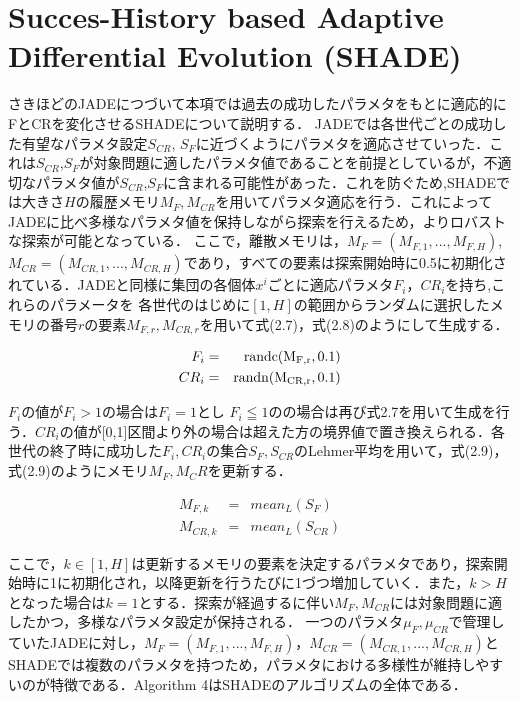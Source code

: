 \documentclass[a4paper,11pt,oneside,openany]{jsbook}
\def\vector#1{\mbox{\boldmath $#1$}}
\begin{document}
\section{Succes-History based Adaptive Differential Evolution (SHADE)}
さきほどのJADEにつづいて本項では過去の成功したパラメタをもとに適応的にFとCRを変化させるSHADEについて説明する．
JADEでは各世代ごとの成功した有望なパラメタ設定$S_{CR}$, $S_{F}$に近づくようにパラメタを適応させていった．これは$S_{CR}$,$S_F$が対象問題に適したパラメタ値であることを前提としているが，不適切なパラメタ値が$S_{CR}$,$S_F$に含まれる可能性があった．これを防ぐため,SHADEでは大きさ$H$の履歴メモリ$M_F,M_{CR}$を用いてパラメタ適応を行う．これによってJADEに比べ多様なパラメタ値を保持しながら探索を行えるため，よりロバストな探索が可能となっている．
ここで，離散メモリは，$M_F = (M_{F,1},...,M_{F,H})$,$M_{CR}= (M_{CR,1},...,M_{CR,H})$であり，すべての要素は探索開始時に0.5に初期化されている．JADEと同様に集団の各個体\vector{x^i}ごとに適応パラメタ$F_i$，$CR_i$を持ち,これらのパラメータを
各世代のはじめに$[1,H]$の範囲からランダムに選択したメモリの番号$r$の要素$M_{F,r},M_{CR,r}$を用いて式(2.7)，式(2.8)のようにして生成する．

\begin{eqnarray}
  F_i & = & \rm{randc}(M_{F,r}, 0.1) \\
  CR_i & = & \rm{randn}(M_{CR,r}, 0.1)
\end{eqnarray}

$F_i$の値が$F_i>1$の場合は$F_i = 1$とし $F_i\leqq1の$の場合は再び式2.7を用いて生成を行う．$CR_i$の値が[0,1]区間より外の場合は超えた方の境界値で置き換えられる．各世代の終了時に成功した$F_i,CR_i$の集合$S_F,S_{CR}$のLehmer平均を用いて，式(2.9)，式(2.9)のようにメモリ$M_F,M_CR$を更新する．

\begin{eqnarray}
  M_{F,k} & = & mean_L(S_F)\\
  M_{CR,k} & = & mean_L(S_{CR})
\end{eqnarray}

ここで，$k \in [1,H]$は更新するメモリの要素を決定するパラメタであり，探索開始時に1に初期化され，以降更新を行うたびに1づつ増加していく．また，$k > H$となった場合は$k = 1$とする．探索が経過するに伴い$M_F,M_{CR}$には対象問題に適したかつ，多様なパラメタ設定が保持される．
一つのパラメタ$\mu _F, \mu _{CR}$で管理していたJADEに対し，$M_F = (M_{F,1},...,M_{F,H})$，$M_{CR}= (M_{CR,1},...,M_{CR,H})$とSHADEでは複数のパラメタを持つため，パラメタにおける多様性が維持しやすいのが特徴である．Algorithm 4はSHADEのアルゴリズムの全体である．
\end{document}
